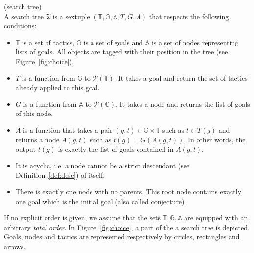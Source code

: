 \documentclass[runningheads,a4paper,draft]{svjour3}
\begin{document}
\begin{definition}\label{def:stree}(search tree)\\
A search tree $\mathfrak{T}$ is a sextuple
$(\mathbb{T},\mathbb{G},\mathbb{A},T,G,A)$
that respects the following conditions:
\begin{itemize}
\item $\mathbb{T}$ is a set of tactics, $\mathbb{G}$ is a set of goals
 and $\mathbb{A}$ is a set of nodes representing lists of goals. All objects 
 are tagged with their position in the tree (see Figure~\ref{fig:choice}).
\item $T$ is a function from $\mathbb{G}$ to $\mathcal{P}(\mathbb{T})$. It
takes a goal and return the set of tactics already applied to this goal.
\item $G$ is a function from $\mathbb{A}$ to $\mathcal{P}(\mathbb{G})$.
It takes a node and returns the list of goals of this node.
\item $A$ is a function that takes a pair $(g,t)\in \mathbb{G} \times 
\mathbb{T}$ such as $t \in T(g)$ and 
returns a node $A(g,t)$ such as $t(g) = G(A(g,t))$. In other words, the output 
$t(g)$ is exactly the list of goals contained in $A(g,t)$.
\item It is acyclic, i.e. a node cannot be a strict descendant (see 
Definition~\ref{def:desc}) of itself.
\item There is exactly one node with no parents. This root node contains 
exactly one goal which is the initial goal (also called conjecture).
\end{itemize}

\end{definition}

If no explicit order is given, we assume that the sets
$\mathbb{T},\mathbb{G},\mathbb{A}$ are equipped with an
arbitrary \textit{total order}. In Figure~\ref{fig:choice}, a part of the a 
search tree is depicted. Goals, nodes and tactics are represented 
respectively by circles, rectangles and arrows.
\end{document}
